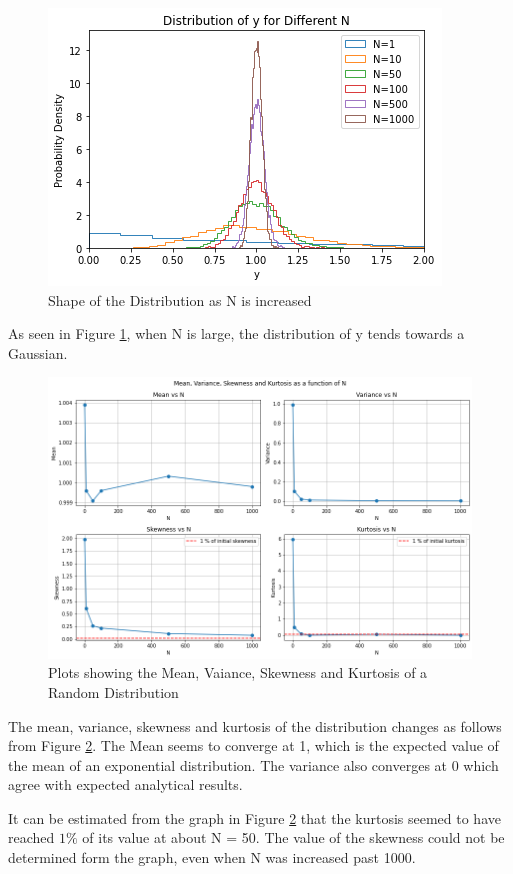 \documentclass[11pt]{article}
\begin{document}
\begin{figure}[!h]
	
	\centering
	\includegraphics[width=0.73\linewidth]{N_Gaussian.png}
	\caption{Shape of the Distribution as N is increased}
	\label{fig:n_gauss}
	
\end{figure}

As seen in Figure \ref*{fig:n_gauss}, when N is large, the distribution of y tends towards a Gaussian. 

\begin{figure}[!h]
	
	\centering
	\includegraphics[width=0.98\linewidth]{stats.png}
	\caption{Plots showing the Mean, Vaiance, Skewness and Kurtosis of a Random Distribution}
	\label{fig:stats}
	
\end{figure}


The mean, variance, skewness and kurtosis of the distribution changes as follows from Figure \ref{fig:stats}. The Mean seems to converge at 1, which is the expected value of the mean of an exponential distribution. The variance also converges at 0 which agree with expected analytical results.
	
	It can be estimated from the graph in Figure \ref{fig:stats} that the kurtosis seemed to have reached $1\%$ of its value at about N = 50. The value of the skewness could not be determined form the graph, even when N was increased past 1000.
	
	
\end{document}
